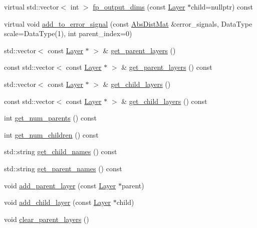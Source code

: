 \begin{DoxyCompactItemize}
\item 
virtual std\+::vector$<$ int $>$ \hyperlink{classlbann_1_1Layer_a22d31298912405660ebb210c0d7c5373}{fp\+\_\+output\+\_\+dims} (const \hyperlink{classlbann_1_1Layer}{Layer} $\ast$child=nullptr) const
\item 
virtual void \hyperlink{classlbann_1_1Layer_a8d942eb2cd37c346edc5ff473e0494a2}{add\+\_\+to\+\_\+error\+\_\+signal} (const \hyperlink{base_8hpp_a9a697a504ae84010e7439ffec862b470}{Abs\+Dist\+Mat} \&error\+\_\+signals, Data\+Type scale=Data\+Type(1), int parent\+\_\+index=0)
\item 
std\+::vector$<$ const \hyperlink{classlbann_1_1Layer}{Layer} $\ast$ $>$ \& \hyperlink{classlbann_1_1Layer_a898e72b93752abf52d35b06459cd360e}{get\+\_\+parent\+\_\+layers} ()
\item 
const std\+::vector$<$ const \hyperlink{classlbann_1_1Layer}{Layer} $\ast$ $>$ \& \hyperlink{classlbann_1_1Layer_a233ceaf4e6c6b5c24dd097ffff511579}{get\+\_\+parent\+\_\+layers} () const
\item 
std\+::vector$<$ const \hyperlink{classlbann_1_1Layer}{Layer} $\ast$ $>$ \& \hyperlink{classlbann_1_1Layer_aa0058c8ec4913efc3e4de5d6f61eb8db}{get\+\_\+child\+\_\+layers} ()
\item 
const std\+::vector$<$ const \hyperlink{classlbann_1_1Layer}{Layer} $\ast$ $>$ \& \hyperlink{classlbann_1_1Layer_a0ad6c5253a4545a7322766d586a4bd33}{get\+\_\+child\+\_\+layers} () const
\item 
int \hyperlink{classlbann_1_1Layer_ac9290d4a6453ccda5f6b4d8b57b49ba3}{get\+\_\+num\+\_\+parents} () const
\item 
int \hyperlink{classlbann_1_1Layer_a1409a117c31a7ea4f2c7a4d22a3e86c3}{get\+\_\+num\+\_\+children} () const
\item 
std\+::string \hyperlink{classlbann_1_1Layer_afc7bf4e2a61a6f47f9e1f185bf92439a}{get\+\_\+child\+\_\+names} () const
\item 
std\+::string \hyperlink{classlbann_1_1Layer_afdf36947beec676a71ecd6167c3bb724}{get\+\_\+parent\+\_\+names} () const
\item 
void \hyperlink{classlbann_1_1Layer_a326668ce624a9bcc719a463820b2e3a4}{add\+\_\+parent\+\_\+layer} (const \hyperlink{classlbann_1_1Layer}{Layer} $\ast$parent)
\item 
void \hyperlink{classlbann_1_1Layer_ace0346ac56fd7ce7b6b44f27f224f35e}{add\+\_\+child\+\_\+layer} (const \hyperlink{classlbann_1_1Layer}{Layer} $\ast$child)
\item 
void \hyperlink{classlbann_1_1Layer_a7336909c78e438ba5332c6c1bddeadd2}{clear\+\_\+parent\+\_\+layers} ()

\end{DoxyCompactItemize}
